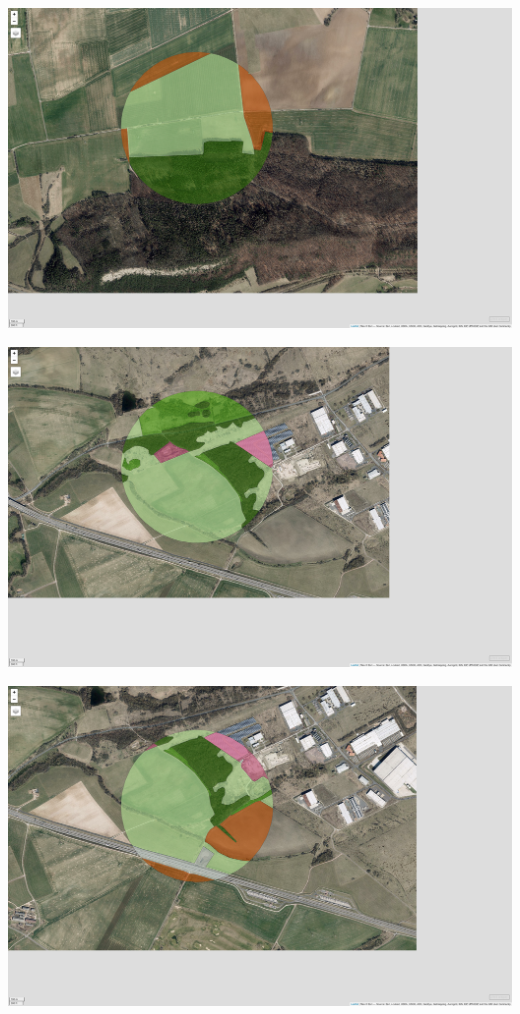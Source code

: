 \documentclass[
  letterpaper,
  DIV=11,
  numbers=noendperiod]{scrartcl}
\begin{document}
\includegraphics{Landscape_Indices_files/figure-pdf/unnamed-chunk-16-1.pdf}

\includegraphics{Landscape_Indices_files/figure-pdf/unnamed-chunk-16-2.pdf}

\includegraphics{Landscape_Indices_files/figure-pdf/unnamed-chunk-16-3.pdf}
\end{document}
